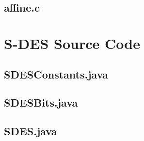 \documentclass[]{article}
\begin{document}
\subsection*{affine.c}
\pagebreak{}


\vspace*{-0.8cm}
	\section*{S-DES Source Code}

\subsection*{SDESConstants.java}
\pagebreak{}
\subsection*{SDESBits.java}
\pagebreak{}
\subsection*{SDES.java}
\pagebreak{}


\break
\setlength{}
\printbibliography[heading=bibintoc,title={References}]

\end{document}
